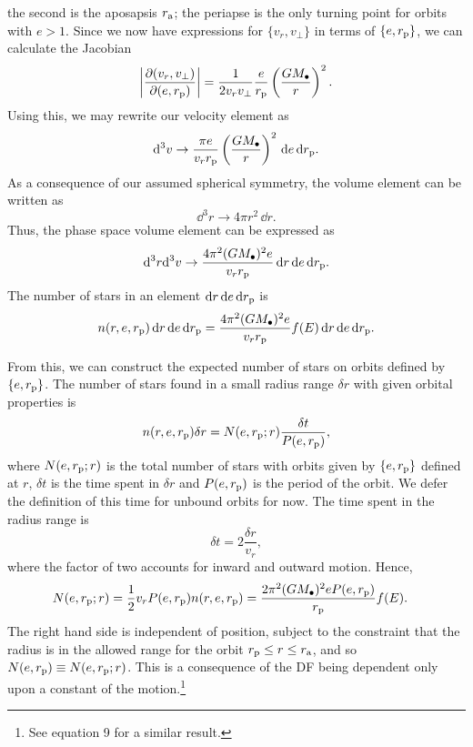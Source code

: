 the second is the aposapsis $r_\mathrm{a}$; the periapse is the only turning point for orbits with $e > 1$. Since we now have expressions for $\{v_r, v_\perp\}$ in terms of $\{e, r_\mathrm{p}\}$, we can 
calculate the Jacobian
\begin{equation}
\left|\dfrac{\partial(v_r, v_\perp)}{\partial(e, r_\mathrm{p})}\right| = \dfrac{1}{2v_rv_\perp}\dfrac{e}{r_\mathrm{p}}\left(\dfrac{GM_\bullet}{r}\right)^2.
\end{equation}
Using this, we may
rewrite our velocity element as
\begin{equation}
\mathrm{d}^3v \rightarrow \dfrac{\pi e}{v_r r_\mathrm{p}}\left(\dfrac{GM_\bullet}{r}\right)^2\,\mathrm{d} e \,\mathrm{d} r_\mathrm{p}.
\end{equation}
As a consequence of our assumed spherical symmetry, 
the volume element can be written as
\begin{equation}
\dd^3r \rightarrow 4\pi r^2 \,\dd r.
\end{equation}
Thus, 
the phase space volume element can be expressed as
\begin{equation}
\mathrm{d}^3r\mathrm{d}^3v \rightarrow \dfrac{4\pi^2(GM_\bullet)^2e}{v_r r_\mathrm{p}}\,\mathrm{d} r\,\mathrm{d} e \,\mathrm{d} r_\mathrm{p}.
\end{equation}
The number of stars in an element $\mathrm{d} r\,\mathrm{d} e\,\mathrm{d} r_\mathrm{p}$ is
\begin{equation}
n(r, e, r_\mathrm{p})\,\mathrm{d} r\,\mathrm{d} e\,\mathrm{d} r_\mathrm{p} = \dfrac{4\pi^2(GM_\bullet)^2e}{v_r r_\mathrm{p}}f(E)\,\mathrm{d} r\,\mathrm{d} e\,\mathrm{d} r_\mathrm{p}.
\end{equation}

From this, we can construct the expected number of stars on orbits defined by $\{e, r_\mathrm{p}\}$. The number of stars found in a small radius range $\delta r$ with given orbital properties is
\begin{equation}
n(r, e, r_\mathrm{p})\delta r = N(e, r_\mathrm{p}; r)\dfrac{\delta t}{P(e, r_\mathrm{p})},
\end{equation}
where $N(e, r_\mathrm{p}; r)$ is the total number of stars with orbits given by $\{e, r_\mathrm{p}\}$ defined at $r$, $\delta t$ is the time spent in $\delta r$ and $P(e, r_\mathrm{p})$ is the period of the orbit. We defer the definition of this time for unbound orbits for now. The time spent in the radius range is
\begin{equation}
\delta t = 2\dfrac{\delta r}{v_r},
\end{equation}
where the factor of two accounts for inward and outward motion. Hence,
\begin{align}
N(e, r_\mathrm{p}; r) = {} & \dfrac{1}{2} v_r P(e, r_\mathrm{p}) n(r, e, r_\mathrm{p}) = \dfrac{2\pi^2(GM_\bullet)^2 e P(e, r_\mathrm{p})}{r_\mathrm{p}}f(E).
\end{align}
The right hand side is independent of position, subject to the constraint that the radius is in the allowed range for the orbit $r_\mathrm{p} \leq r \leq r_\mathrm{a}$, and so $N(e, r_\mathrm{p}) \equiv N(e, r_\mathrm{p}; r)$. This is a consequence of the DF being dependent only upon a constant of the motion.\footnote{See \citet{Bahcall1976} equation 9 for a similar result.}

